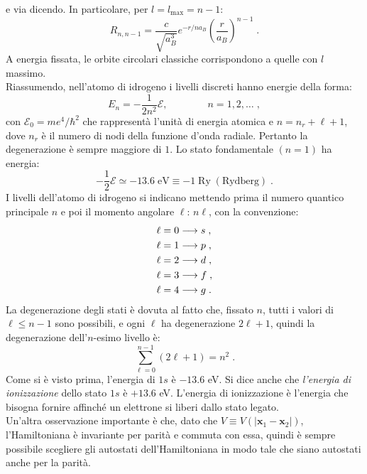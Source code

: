 \documentclass[10pt,a4paper]{report}
\theoremstyle{definition}
\numberwithin{equation}{section}
\begin{document}
e via dicendo. In particolare, per $l=l_{\mathrm{max}}=n-1$:
\begin{equation}
R_{n,n-1}=\frac{c}{\sqrt{a_B^3}}e^{-r/na_B}\left(\frac{r}{a_B}\right)^{n-1}\;.
\end{equation}
A energia fissata, le orbite circolari classiche corrispondono a quelle con $l$ massimo. \\
Riassumendo, nell'atomo di idrogeno i livelli discreti hanno energie della forma:
\begin{equation}
E_n=-\frac{1}{2n^2}\mathcal{E},\qquad\qquad n=1,2,\ldots\;,
\end{equation}
con $\mathcal{E}_0=me^4/\hbar^2$ che rappresentà l'unità di energia atomica e $n=n_r+\ell+1$, dove $n_r$ è il numero di nodi della funzione d'onda radiale. Pertanto la degenerazione è sempre maggiore di $1$. Lo stato fondamentale $(n=1)$ ha energia:
\begin{equation}
-\frac{1}{2}\mathcal{E}\simeq -13.6\;\mbox{eV}\equiv -1\;\mbox{Ry}\;(\mbox{Rydberg})\;.
\end{equation}
I livelli dell'atomo di idrogeno si indicano mettendo prima il numero quantico principale $n$ e poi il momento angolare $\ell$: $n\ell$, con la convenzione:
\begin{align}
\ell=0 &\longrightarrow s \notag\;, \\
\ell=1 &\longrightarrow p \notag\;, \\
\ell=2 &\longrightarrow d \notag\;, \\
\ell=3 &\longrightarrow f \notag\;, \\
\ell=4 &\longrightarrow g\;.
\end{align}
La degenerazione degli stati è dovuta al fatto che, fissato $n$, tutti i valori di $\ell\le n-1$ sono possibili, e ogni $\ell$ ha degenerazione $2\ell+1$, quindi la degenerazione dell'$n$-esimo livello è:
\begin{equation}
\sum_{\ell=0}^{n-1} (2\ell+1)=n^2\;.
\end{equation}
Come si è visto prima, l'energia di $1s$ è $-13.6$ eV. Si dice anche che \textit{l'energia di ionizzazione} dello stato $1s$ è $+13.6$ eV. L'energia di ionizzazione è l'energia che bisogna fornire affinché un elettrone si liberi dallo stato legato. \\
Un'altra osservazione importante è che, dato che $V\equiv V(|\mathbf{x}_1-\mathbf{x}_2|)$, l'Hamiltoniana è invariante per parità e commuta con essa, quindi è sempre possibile scegliere gli autostati dell'Hamiltoniana in modo tale che siano autostati anche per la parità.
\end{document}
